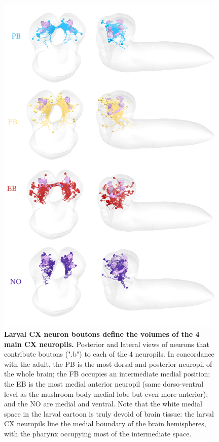         
        \begin{figure}
            \centering
            \includegraphics[width=11cm]{Figs/CX/CATMAIDCXneurons.pdf}
            \caption[Larval CX neuron boutons define the volumes of the 4 main CX neuropils]{\textbf{Larval CX neuron boutons define the volumes of the 4 main CX neuropils.} Posterior and lateral views of neurons that contribute boutons (".b") to each of the 4 neuropils. In concordance with the adult, the PB is the most dorsal and posterior neuropil of the whole brain; the FB occupies an intermediate medial position; the EB is the most medial anterior neuropil (same dorso-ventral level as the mushroom body medial lobe but even more anterior); and the NO are medial and ventral. Note that the white medial space in the larval cartoon is truly devoid of brain tissue: the larval CX neuropils line the medial boundary of the brain hemispheres, with the pharynx occupying most of the intermediate space.
            }
            \label{cxneuropils}
        \end{figure}    

